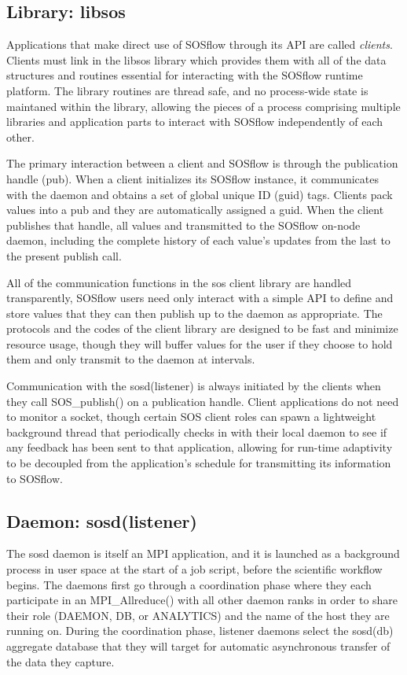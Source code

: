 \subsection{Library: libsos} %
%
Applications that make direct use of SOSflow through its API are called
\textit{clients}.
%
Clients must link in the libsos library which provides them with all of
the data structures and routines essential for interacting with
the SOSflow runtime platform.
%
The library routines are thread safe, and no process-wide state is
maintaned within the library, allowing the pieces of a process
comprising multiple libraries and application parts to interact with
SOSflow independently of each other.
%
\par
The primary interaction between a client and SOSflow is through the
publication handle (pub).
%
When a client initializes its SOSflow instance, it communicates with the
daemon and obtains a set of global unique ID (guid) tags.
%
Clients pack values into a pub and they are automatically assigned a guid.
%
When the client publishes that handle, all values and transmitted to
the SOSflow on-node daemon, including the complete history of each
value's updates from the last to the present publish call.
%
\par
%
All of the communication functions in the sos client library are
handled transparently, SOSflow users need only interact with a simple API
to define and store values that they can then publish up to the daemon
as appropriate.
%
The protocols and the codes of the client library are designed to be
fast and minimize resource usage, though they will buffer values for
the user if they choose to hold them and only transmit to the daemon
at intervals.
%
\par
%
Communication with the sosd(listener) is always initiated by the
clients when they call SOS\_publish() on a publication handle.
%
Client applications do not need to monitor a socket, though certain
SOS client roles can spawn a lightweight background thread that
periodically checks in with their local daemon to see if any feedback
has been sent to that application, allowing for run-time adaptivity to
be decoupled from the application's schedule for transmitting its
information to SOSflow.


\subsection{Daemon: sosd(listener)} %
The sosd daemon is itself an MPI application, and it is launched as a
background process in user space at the start of a job script, before
the scientific workflow begins.
%
The daemons first go through a coordination phase where they each
participate in an MPI\_Allreduce() with all other daemon ranks in
order to share their role (DAEMON, DB, or ANALYTICS) and the name of
the host they are running on.
%
During the coordination phase, listener daemons select the sosd(db)
aggregate database that they will target for automatic asynchronous
transfer of the data they capture.

